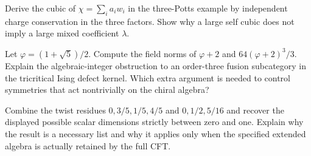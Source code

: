 \begin{exercise}\label{ex:identification-Potts}
Derive the cubic of $\chi=\sum_ia_iw_i$ in the three-Potts example
by independent charge conservation in the three factors. Show why
a large self cubic does not imply a large mixed coefficient
$\lambda$.

\par\smallskip{}\par
\end{exercise}
\begin{exercise}\label{ex:identification-norm}
Let $\varphi=(1+\sqrt5)/2$. Compute the field norms of
$\varphi+2$ and $64(\varphi+2)^3/3$. Explain the
algebraic-integer obstruction to an order-three fusion
subcategory in the tricritical Ising defect kernel. Which extra
argument is needed to control symmetries that act nontrivially
on the chiral algebra?

\par\smallskip{}\par
\end{exercise}
\begin{exercise}\label{ex:identification-residues}
Combine the twist residues $0,3/5,1/5,4/5$ and
$0,1/2,5/16$ and recover the displayed possible scalar
dimensions strictly between zero and one. Explain why the result
is a necessary list and why it applies only when the specified
extended algebra is actually retained by the full CFT.

\par\smallskip{}\par
\end{exercise}

